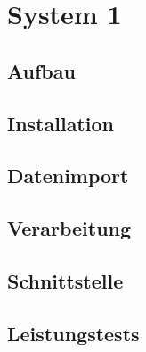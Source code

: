 \chapter{System 1}

\section{Aufbau}

\section{Installation}

\section{Datenimport}

\section{Verarbeitung}

\section{Schnittstelle}

\section{Leistungstests}